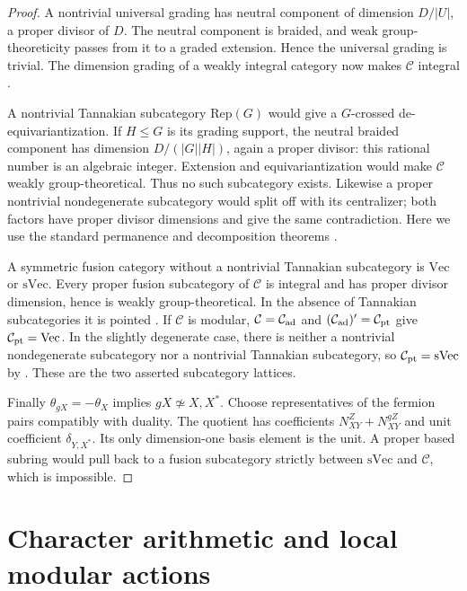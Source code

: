 \documentclass[11pt,a4paper]{article}
\numberwithin{equation}{section}
\begin{document}
\begin{proof}
A nontrivial universal grading has neutral component of dimension
$D/|U|$, a proper divisor of $D$. The neutral component is braided, and
weak group-theoreticity passes from it to a graded extension. Hence the
universal grading is trivial. The dimension grading of a weakly integral
category now makes $\mathcal C$ integral
\cite[Theorem~3.10]{GNnil}.

A nontrivial Tannakian subcategory $\mathrm{Rep}(G)$ would give a
$G$-crossed de-equivariantization. If $H\le G$ is its grading support,
the neutral braided component has dimension $D/(|G||H|)$, again a proper
divisor: this rational number is an algebraic integer. Extension and
equivariantization would make $\mathcal C$ weakly group-theoretical.
Thus no such subcategory exists. Likewise a proper nontrivial
nondegenerate subcategory would split off with its centralizer; both
factors have proper divisor dimensions and give the same contradiction.
Here we use the standard permanence and decomposition theorems
\cite[Proposition~4.1]{ENOsolvable}
\cite[Theorems~3.13 and~4.44]{DGNO}
\cite[Proposition~4.1]{NataleWGT}.

A symmetric fusion category without a nontrivial Tannakian subcategory
is $\mathrm{Vec}$ or $\mathrm{sVec}$. Every proper fusion subcategory
of $\mathcal C$ is integral and has proper divisor dimension, hence is
weakly group-theoretical. In the absence of Tannakian subcategories it
is pointed \cite[Theorem~3.1]{NataleCore}. If $\mathcal C$ is modular,
$\mathcal C=\mathcal C_{\rm ad}$ and
$(\mathcal C_{\rm ad})'=\mathcal C_{\rm pt}$ give
$\mathcal C_{\rm pt}=\mathrm{Vec}$. In the slightly degenerate case,
there is neither a nontrivial nondegenerate subcategory nor a nontrivial
Tannakian subcategory, so $\mathcal C_{\rm pt}=\mathrm{sVec}$ by
\cite[Lemma~7.1]{NataleWGT}. These are the two asserted subcategory
lattices.

Finally $\theta_{gX}=-\theta_X$ implies $gX\not\simeq X,X^*$.
Choose representatives of the fermion pairs compatibly with duality.
The quotient has coefficients $N_{XY}^Z+N_{XY}^{gZ}$ and unit
coefficient $\delta_{Y,X^*}$. Its only dimension-one basis element is
the unit. A proper based subring would pull back to a fusion subcategory
strictly between $\mathrm{sVec}$ and $\mathcal C$, which is impossible.
\end{proof}

\section{Character arithmetic and local modular actions}\label{sec:local-tools}
\end{document}
